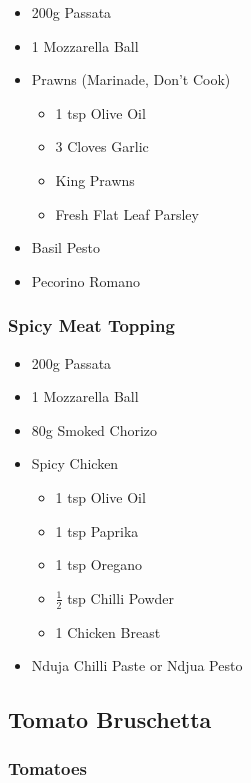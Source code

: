 \documentclass[11pt, english]{article}
\begin{document}
	\begin{itemize}
        \setlength\itemsep{0cm}
                \item 200g Passata
		\item 1 Mozzarella Ball
		\item Prawns (Marinade, Don't Cook)
		\begin{itemize}
			\item 1 tsp Olive Oil
                	\item 3 Cloves Garlic
			\item King Prawns
			\item Fresh Flat Leaf Parsley
		\end{itemize}
		\item Basil Pesto
		\item Pecorino Romano
        \end{itemize}

		\subsubsection*{Spicy Meat Topping}
	
	\begin{itemize}
        \setlength\itemsep{0cm}
                \item 200g Passata
		\item 1 Mozzarella Ball
		\item 80g Smoked Chorizo
		\item Spicy Chicken 
		\begin{itemize}
			\item 1 tsp Olive Oil
			\item 1 tsp Paprika
			\item 1 tsp Oregano
			\item $\frac{1}{2}$ tsp Chilli Powder
			\item 1 Chicken Breast
		\end{itemize}
		\item Nduja Chilli Paste or Ndjua Pesto
        \end{itemize}

\newpage

	\subsection{Tomato Bruschetta}

		\subsubsection*{Tomatoes}
\end{document}
